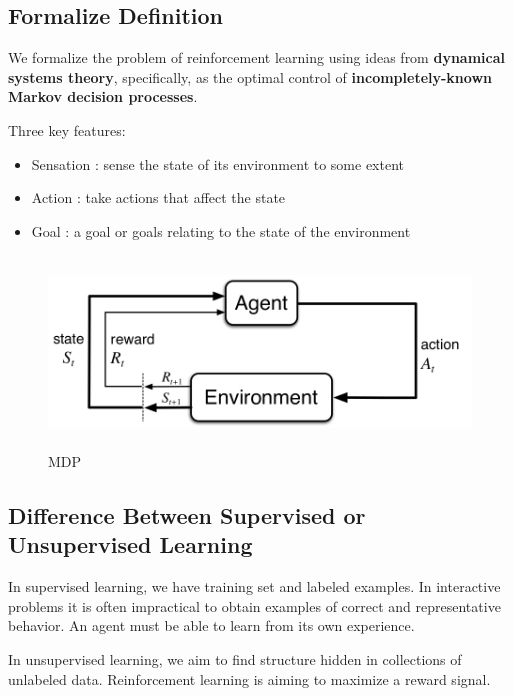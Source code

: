 \documentclass{article}
\begin{document}
\begin{CJK*}{UTF8}{gbsn}
\subsection{Formalize Definition}
We formalize the problem of reinforcement learning using ideas from \textbf{dynamical systems theory}, specifically, as the optimal control of \textbf{incompletely-known Markov decision processes}.

Three key features:
\begin{itemize}
\item Sensation : sense the state of its environment to some extent
\item Action : take actions that affect the state
\item Goal : a goal or goals relating to the state of the environment
\end{itemize}

\begin{figure}[H]
\centering
\includegraphics[width=6in,height=2in]{mdp}
\caption{MDP}
\end{figure}


\subsection{Difference Between Supervised or Unsupervised Learning}
In supervised learning, we have training set and labeled examples. In interactive problems it is often impractical to obtain examples of correct and representative behavior. An agent must be able to learn from its own experience.

In unsupervised learning, we aim to find structure hidden in collections of unlabeled data. Reinforcement learning is aiming to maximize a reward signal.


\end{CJK*}
\end{document}
